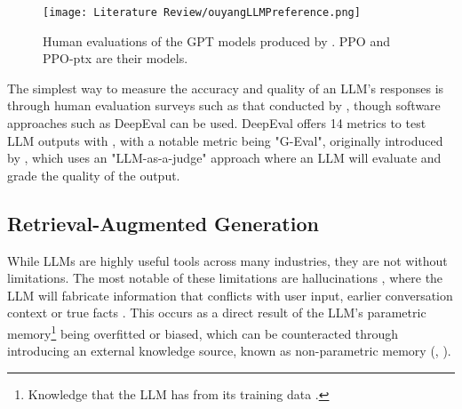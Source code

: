
\begin{figure}[H] 
    \centering
    \texttt{[image: Literature Review/ouyangLLMPreference.png]}
    \caption{Human evaluations of the GPT models produced by \textcite{ouyang_training_2022}. PPO and PPO-ptx are their models.}
    \label{fig:LLMPref}
\end{figure}

The simplest way to measure the accuracy and quality of an LLM's responses is through human evaluation surveys such as that conducted by \textcite{ouyang_training_2022}, though
software approaches such as DeepEval can be used. DeepEval offers 14 metrics to test LLM outputs with \autocite{deepeval_introduction_2024},
with a notable metric being "G-Eval", originally introduced by \textcite{liu_g-eval_2023}, which uses an "LLM-as-a-judge" approach where an LLM will evaluate
and grade the quality of the output.


\subsection{Retrieval-Augmented Generation}\label{sec:LitReviewRAG}

While LLMs are highly useful tools across many industries, they are not without limitations. The most notable 
of these limitations are hallucinations \autocite{lewis_retrieval-augmented_2021}, where the LLM will fabricate 
information that conflicts with user input, earlier conversation context or true facts \autocite{zhang_sirens_2023}. This occurs as a direct result of the LLM's parametric memory\footnote{Knowledge that the LLM has from its training data \autocite{siriwardhana_improving_2023}.}
being overfitted or biased, which can be counteracted through introducing an external knowledge source, known as non-parametric memory (\textcite{komeili_internet-augmented_2022}, \textcite{siriwardhana_improving_2023}).

